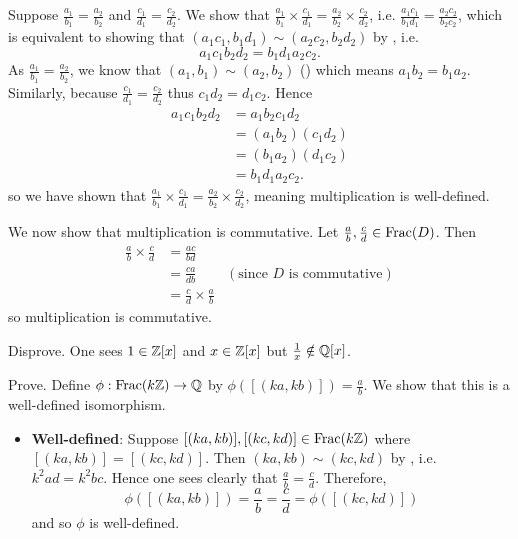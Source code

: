 \begin{questions}
    \item Suppose $\frac{a_1}{b_1} = \frac{a_2}{b_2}$ and $\frac{c_1}{d_1} = \frac{c_2}{d_2}$. We show that $\frac{a_1}{b_1} \times \frac{c_1}{d_1} = \frac{a_2}{b_2} \times \frac{c_2}{d_2}$, i.e. $\frac{a_1c_1}{b_1d_1} = \frac{a_2c_2}{b_2c_2}$, which is equivalent to showing that $(a_1c_1, b_1d_1) \mathrel{\sim} (a_2c_2, b_2d_2)$ by , i.e.
    \[
        a_1c_1b_2d_2 = b_1d_1a_2c_2.
    \]
    As $\frac{a_1}{b_1} = \frac{a_2}{b_2}$, we know that $(a_1, b_1) \mathrel{\sim} (a_2, b_2)$ () which means $a_1b_2 = b_1a_2$. Similarly, because $\frac{c_1}{d_1} = \frac{c_2}{d_2}$ thus $c_1d_2 = d_1c_2$. Hence
    \begin{align*}
        a_1c_1b_2d_2 &= a_1b_2c_1d_2\\
        &= (a_1b_2)(c_1d_2)\\
        &= (b_1a_2)(d_1c_2)\\
        &= b_1d_1a_2c_2.
    \end{align*}
    so we have shown that $\frac{a_1}{b_1} \times \frac{c_1}{d_1} = \frac{a_2}{b_2} \times \frac{c_2}{d_2}$, meaning multiplication is well-defined.

    We now show that multiplication is commutative. Let $\frac ab, \frac cd \in \mathrm{Frac}(D)$. Then
    \begin{align*}
        \frac ab \times \frac cd &= \frac{ac}{bd}\\
        &= \frac{ca}{db} & (\text{since } D \text{ is commutative})\\
        &= \frac cd \times \frac ab
    \end{align*}
    so multiplication is commutative.

    \item \begin{partquestions}{\alph*}
        \item Disprove. One sees $1 \in \mathbb{Z}[x]$ and $x \in \mathbb{Z}[x]$ but $\frac1x \notin \mathbb{Q}[x]$.
        
        \item Prove. Define $\phi: \mathrm{Frac}(k\mathbb{Z}) \to \mathbb{Q}$ by $\phi([(ka, kb)]) = \frac ab$. We show that this is a well-defined isomorphism.
        \begin{itemize}
            \item \textbf{Well-defined}: Suppose $[(ka, kb)], [(kc, kd)] \in \mathrm{Frac}(k\mathbb{Z})$ where $[(ka,kb)]=[(kc,kd)]$. Then $(ka, kb) \mathrel{\sim} (kc, kd)$ by , i.e. $k^2ad = k^2bc$. Hence one sees clearly that $\frac ab = \frac cd$. Therefore,
            \[
                \phi([(ka,kb)]) = \frac ab = \frac cd = \phi([(kc, kd)])
            \]
            and so $\phi$ is well-defined.
            

\end{itemize}
\end{partquestions}
\end{questions}
